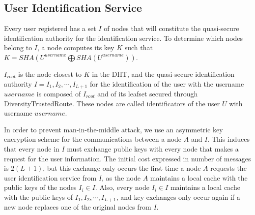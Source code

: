 \subsection{User Identification Service}
\label{sec:identificators}

Every user registered has a set $I$ of nodes that
will constitute the quasi-secure identification authority for the
identification service.
To determine which  nodes belong to $I$, a node computes its key $K$ such that
$K = SHA(U^{username} \bigoplus SHA(U^{username}))$. 

$I_{root}$ is the node closest to $K$ in the DHT, and the quasi-secure identification authority $I =
{I_1, I_2, \cdots, I_{L+1}}$ for the identification of the user with the
username $username$ is composed of $I_{root}$ and of its leafset secured
through DiversityTrustedRoute. These nodes are called identificators of the
user $U$ with username $username$.

 In order to prevent man-in-the-middle attack, we use an asymmetric key
encryption scheme for the communications between a node $A$ and $I$. This
induces that every node in $I$ must exchange public keys with every node that
makes a request for the user information. The initial cost expressed in number
of messages is $2(L+1)$, but this exchange only occurs the first time a
node $A$ requests the user identification service from $I$, as the node $A$
maintains a local cache with the public keys of the nodes $I_i \in I$. Also,
every node $I_i \in I$ maintains a local cache with the public keys of ${I_1,
I_2, \cdots, I_{L+1}}$, and key exchanges only occur again if a new node
replaces one of the original nodes from $I$.

